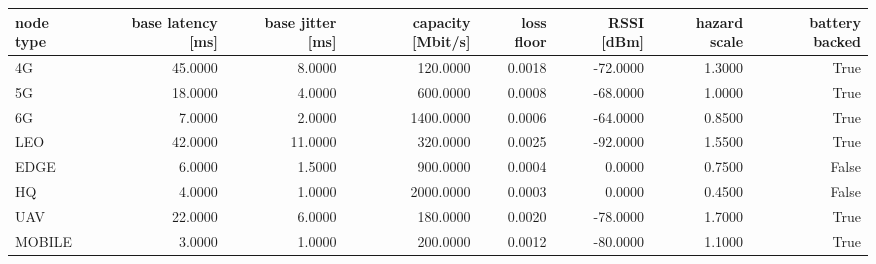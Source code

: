 \begin{tabular}{lrrrrrrr}
\toprule
node type & base latency [ms] & base jitter [ms] & capacity [Mbit/s] & loss floor & RSSI [dBm] & hazard scale & battery backed \\
\midrule
4G & 45.0000 & 8.0000 & 120.0000 & 0.0018 & -72.0000 & 1.3000 & True \\
5G & 18.0000 & 4.0000 & 600.0000 & 0.0008 & -68.0000 & 1.0000 & True \\
6G & 7.0000 & 2.0000 & 1400.0000 & 0.0006 & -64.0000 & 0.8500 & True \\
LEO & 42.0000 & 11.0000 & 320.0000 & 0.0025 & -92.0000 & 1.5500 & True \\
EDGE & 6.0000 & 1.5000 & 900.0000 & 0.0004 & 0.0000 & 0.7500 & False \\
HQ & 4.0000 & 1.0000 & 2000.0000 & 0.0003 & 0.0000 & 0.4500 & False \\
UAV & 22.0000 & 6.0000 & 180.0000 & 0.0020 & -78.0000 & 1.7000 & True \\
MOBILE & 3.0000 & 1.0000 & 200.0000 & 0.0012 & -80.0000 & 1.1000 & True \\
\bottomrule
\end{tabular}
